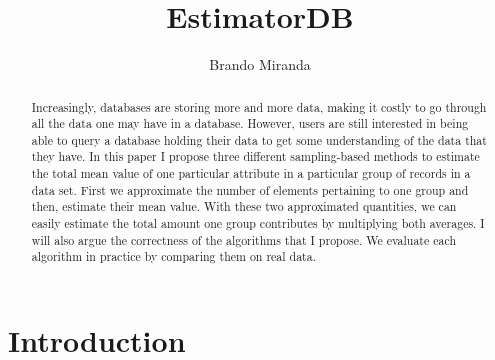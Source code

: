 \documentclass[a4paper]{article}
\title{EstimatorDB}
\author{Brando Miranda}
\begin{document}
\maketitle

\begin{abstract}
Increasingly, databases are storing more and more data, making it costly to go through all the data one may have in a database.
However, users are still interested in being able to query a database holding their data to get some understanding of the data that they have. %
In this paper I propose three different sampling-based methods to estimate the total mean value of one particular attribute in a particular group of records in a data set. %
First we approximate the number of elements pertaining to one group and then, estimate their mean value.
With these two approximated quantities, we can easily estimate the total amount one group contributes by multiplying both averages.
I will also argue the correctness of the algorithms that I propose.
We evaluate each algorithm in practice by comparing them on real data.
\end{abstract}

\section{Introduction}
\end{document}
